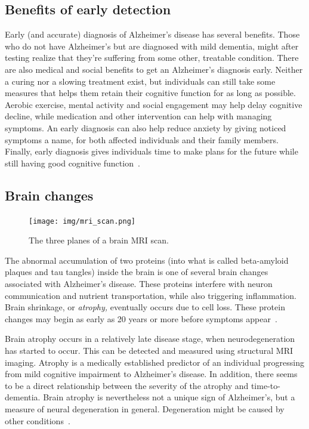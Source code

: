 \documentclass{kththesis}
\begin{document}
\subsection{Benefits of early detection}
Early (and accurate) diagnosis of Alzheimer's disease has several benefits. Those who do not have Alzheimer's but are diagnosed with mild dementia, might after testing realize that they're suffering from some other, treatable condition. There are also medical and social benefits to get an Alzheimer's diagnosis early. Neither a curing nor a slowing treatment exist, but individuals can still take some measures that helps them retain their cognitive function for as long as possible. Aerobic exercise, mental activity and social engagement may help delay cognitive decline, while medication and other intervention can help with managing symptoms. An early diagnosis can also help reduce anxiety by giving noticed symptoms a name, for both affected individuals and their family members. Finally, early diagnosis gives individuals time to make plans for the future while still having good cognitive function~\cite[p. 406-409]{factsfigures2018}.

\subsection{Brain changes}
\begin{figure}
  \centering
  \texttt{[image: img/mri\_scan.png]}
  \caption{The three planes of a brain MRI scan.}
\end{figure}
The abnormal accumulation of two proteins (into what is called beta-amyloid plaques and tau tangles) inside the brain is one of several brain changes associated with Alzheimer's disease. These proteins interfere with neuron communication and nutrient transportation, while also triggering inflammation. Brain shrinkage, or \textit{atrophy,} eventually occurs due to cell loss. These protein changes may begin as early as 20 years or more before symptoms appear~\cite{factsfigures2018}.

Brain atrophy occurs in a relatively late disease stage, when neurodegeneration has started to occur. This can be detected and measured using structural MRI imaging. Atrophy is a medically established predictor of an individual progressing from mild cognitive impairment to Alzheimer's disease. In addition, there seems to be a direct relationship between the severity of the atrophy and time-to-dementia. Brain atrophy is nevertheless not a unique sign of Alzheimer's, but a measure of neural degeneration in general. Degeneration might be caused by other conditions~\cite{jack2010brain}.
\end{document}
